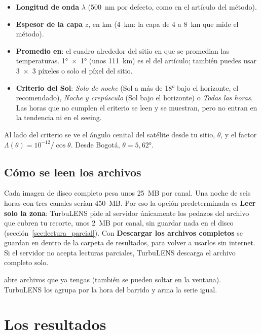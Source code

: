 \begin{itemize}
\item \textbf{Longitud de onda} $\lambda$ (500~nm por defecto, como en el artículo del método).
\item \textbf{Espesor de la capa} $z$, en km (4~km: la capa de 4 a 8~km que mide el método).
\item \textbf{Promedio en}: el cuadro alrededor del sitio en que se promedian las temperaturas. 1°~×~1° (unos 111~km) es
el del artículo; también puedes usar 3~×~3 píxeles o solo el píxel del sitio.
\item \textbf{Criterio del Sol}: \emph{Solo de noche} (Sol a más de 18° bajo el horizonte, el recomendado),
\emph{Noche y crepúsculo} (Sol bajo el horizonte) o \emph{Todas las horas}. Las horas que no cumplen el criterio se leen
y se muestran, pero no entran en la tendencia ni en el seeing.
\end{itemize}
Al lado del criterio se ve el ángulo cenital del satélite desde tu sitio, $\theta$, y el factor
$\Lambda(\theta) = 10^{-12}/\cos\theta$. Desde Bogotá, $\theta = 5{,}62°$.

\subsection{Cómo se leen los archivos}

Cada imagen de disco completo pesa unos 25~MB por canal. Una noche de seis horas con tres canales serían 450~MB. Por eso
la opción predeterminada es \textbf{Leer solo la zona}: TurbuLENS pide al servidor únicamente los pedazos del archivo que
cubren tu recorte, unos 2~MB por canal, sin guardar nada en el disco (sección~\ref{sec:lectura_parcial}). Con
\textbf{Descargar los archivos completos} se guardan en  dentro de la carpeta de resultados, para
volver a usarlos sin internet. Si el servidor no acepta lecturas parciales, TurbuLENS descarga el archivo completo solo.

 abre archivos  que ya tengas (también se pueden soltar en la ventana).
TurbuLENS los agrupa por la hora del barrido y arma la serie igual.

\section{Los resultados}

